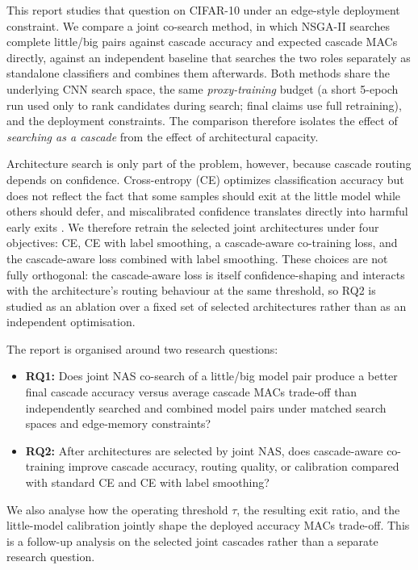 \documentclass[conference]{IEEEtran}
\begin{document}
This report studies that question on CIFAR-10 under an edge-style deployment
constraint. We compare a joint co-search method, in which NSGA-II searches
complete little/big pairs against cascade accuracy and expected cascade MACs
directly, against an independent baseline that searches the two roles
separately as standalone classifiers and combines them afterwards. Both
methods share the underlying CNN search space, the same
\emph{proxy-training} budget (a short 5-epoch run used only to rank
candidates during search; final claims use full retraining), and the
deployment constraints. The comparison therefore isolates the effect of
\emph{searching as a cascade} from the effect of architectural capacity.

Architecture search is only part of the problem, however, because cascade
routing depends on confidence. Cross-entropy (CE) optimizes classification
accuracy but does not reflect the fact that some samples should exit at the
little model while others should defer, and miscalibrated confidence
translates directly into harmful early exits
\cite{guo2017calibration,mueller2019labelsmoothing,li2021learningtocascade}.
We therefore retrain the selected joint architectures under four objectives:
CE, CE with label smoothing, a cascade-aware co-training loss, and the
cascade-aware loss combined with label smoothing. These choices are not
fully orthogonal: the cascade-aware loss is itself confidence-shaping and
interacts with the architecture's routing behaviour at the same threshold, so RQ2 is studied as an ablation over a fixed set of selected
architectures rather than as an independent optimisation.

The report is organised around two research questions:

\begin{itemize}
    \item \textbf{RQ1:} Does joint NAS co-search of a little/big model pair
    produce a better final cascade accuracy versus average cascade MACs
    trade-off than independently searched and combined model pairs under
    matched search spaces and edge-memory constraints?

    \item \textbf{RQ2:} After architectures are selected by joint NAS, does
    cascade-aware co-training improve cascade accuracy, routing quality, or
    calibration compared with standard CE and CE with label smoothing?
\end{itemize}

We also analyse how the operating threshold $\tau$, the resulting exit
ratio, and the little-model calibration jointly shape the deployed
accuracy MACs trade-off. This is a follow-up analysis on the selected
joint cascades rather than a separate research question.
\end{document}
